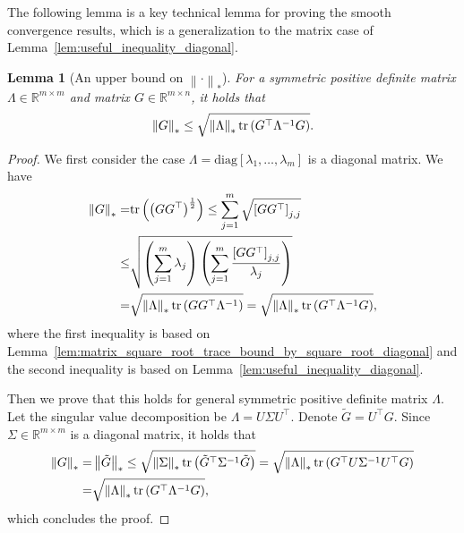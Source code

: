 \documentclass{article}
\newtheorem{lemma}{Lemma}
\theoremstyle{remark}
\newcommand{\Norm}[1]{\left\|#1\right\|}
\newcommand{\tr}[1]{{\rm tr}\left( #1 \right)}
\newcommand{\RR}{\mathbb{R}}
\newcommand{\tG}{\tilde{G}}
\begin{document}
The following lemma is a key technical lemma for proving the smooth convergence results, which is a generalization to the matrix case of Lemma~\ref{lem:useful_inequality_diagonal}.
\begin{lemma}[An upper bound on $\Norm{\cdot}_*$]\label{lem:inequality_bound_sum_square_root}
    For a symmetric positive definite matrix $\Lambda \in \RR^{m\times m}$ and matrix $G \in \RR^{m\times n}$, it holds that
    \begin{align}\label{eq:lem_inequality_bound_sum_square_root}
        \Norm{G}_* \le \sqrt{\Norm{\Lambda}_* \tr{G^\top \Lambda^{-1} G}} .
    \end{align}
\end{lemma}
\begin{proof}
    We first consider the case $\Lambda = \text{diag}[\lambda_1,\dots,\lambda_m]$ is a diagonal matrix. We have
    \begin{align*}
        \Norm{G}_* =& \tr{\left( GG^\top \right)^{\frac{1}{2}}} \le \sum_{j=1}^m \sqrt{\left[ G G^\top \right]_{j,j}} \\
        \le&
        \sqrt{\left( \sum_{j=1}^m \lambda_j \right) \left( \sum_{j=1}^m \frac{\left[ G G^\top \right]_{j,j}}{\lambda_j} \right)} \\
        =& \sqrt{\Norm{\Lambda}_* \tr{GG^\top \Lambda^{-1}}} = \sqrt{\Norm{\Lambda}_* \tr{G^\top \Lambda^{-1} G}} ,
    \end{align*}
    where the first inequality is based on Lemma~\ref{lem:matrix_square_root_trace_bound_by_square_root_diagonal} and the second inequality is based on Lemma~\ref{lem:useful_inequality_diagonal}.

    Then we prove that this holds for general symmetric positive definite matrix $\Lambda$. Let the singular value decomposition be $\Lambda = U \Sigma U^\top$. Denote $\tG = U^\top G$. Since $\Sigma \in \RR^{m\times m}$ is a diagonal matrix, it holds that
    \begin{align*}
        \Norm{G}_* =& \Norm{\tG}_* \le \sqrt{\Norm{\Sigma}_* \tr{\tG^\top \Sigma^{-1} \tG}} = \sqrt{\Norm{\Lambda}_* \tr{G^\top U\Sigma^{-1} U^\top G}} \\
        =& \sqrt{\Norm{\Lambda}_* \tr{G^\top \Lambda^{-1} G}} ,
    \end{align*}
    which concludes the proof.
\end{proof}
\end{document}
